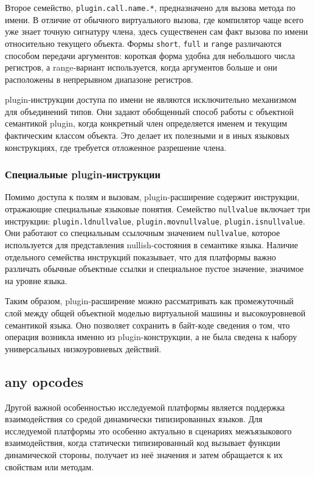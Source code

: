 Второе семейство, \texttt{plugin.call.name.*}, предназначено для вызова метода по имени. В отличие
от обычного виртуального вызова, где компилятор чаще всего уже знает точную сигнатуру члена,
здесь существенен сам факт вызова по имени относительно текущего объекта. Формы \texttt{short},
\texttt{full} и \texttt{range} различаются способом передачи аргументов: короткая форма удобна
для небольшого числа регистров, а range-вариант используется, когда аргументов больше и они
расположены в непрерывном диапазоне регистров.

plugin-инструкции доступа по имени не являются исключительно
механизмом для объединений типов. Они задают обобщенный способ работы с объектной семантикой plugin,
когда конкретный член определяется именем и текущим фактическим классом объекта. Это делает их
полезными и в иных языковых конструкциях, где требуется отложенное разрешение члена.

\subsubsection{Специальные plugin-инструкции}

Помимо доступа к полям и вызовам, plugin-расширение содержит инструкции, отражающие специальные
языковые понятия. Семейство \texttt{nullvalue} включает три инструкции:
\texttt{plugin.ldnullvalue}, \texttt{plugin.movnullvalue}, \newline \texttt{plugin.isnullvalue}. Они работают со
специальным ссылочным значением \texttt{nullvalue}, которое используется для представления
nullish-состояния в семантике языка. Наличие отдельного семейства инструкций показывает, что для
платформы важно различать обычные объектные ссылки и специальное пустое значение, значимое на
уровне языка.

\par
Таким образом, plugin-расширение можно рассматривать как промежуточный слой между общей объектной моделью
виртуальной машины и высокоуровневой семантикой языка. Оно позволяет сохранить в байт-коде сведения
о том, что операция возникла именно из plugin-конструкции, а не была сведена к набору универсальных
низкоуровневых действий.

\subsection{any opcodes}

Другой важной особенностью исследуемой платформы является поддержка взаимодействия со средой
динамически типизированных языков. Для исследуемой платформы это особенно актуально в сценариях межъязыкового
взаимодействия, когда статически типизированный код вызывает функции динамической стороны, получает
из неё значения и затем обращается к их свойствам или методам.

